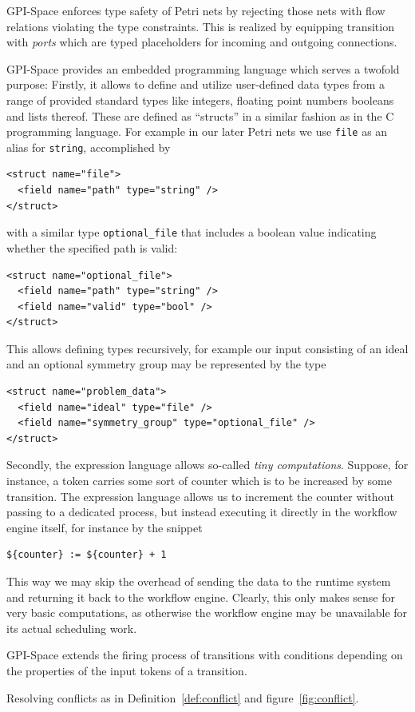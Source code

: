 \documentclass[
  paper=a4,
  titlepage,
  bibliography=totoc,
  listof=totoc,
  pagesize=pdftex
]{scrartcl}
\numberwithin{figure}{section}
\numberwithin{equation}{section}
\numberwithin{table}{section}
\theoremstyle{definition}
\numberwithin{definition}{section}
\begin{document}
\begin{description}[leftmargin=\parindent]
    GPI-Space enforces type safety of Petri nets by rejecting those nets with flow
    relations violating the type constraints. This is realized by equipping transition with
    \emph{ports} which are typed placeholders for incoming and outgoing connections.
  \item[Expression Language:] GPI-Space provides an embedded programming language which
    serves a twofold purpose: Firstly, it allows to define and utilize user-defined data
    types from a range of provided standard types like integers, floating point numbers
    booleans and lists thereof. These are defined as \enquote{structs} in a similar
    fashion as in the C programming language. For example in our later Petri nets we use
    \texttt{file} as an alias for \texttt{string}, accomplished by
    \begin{verbatim}
<struct name="file">
  <field name="path" type="string" />
</struct>\end{verbatim}%
    with a similar type \texttt{optional\_file} that includes a boolean value indicating
    whether the specified path is valid:
    \begin{verbatim}
<struct name="optional_file">
  <field name="path" type="string" />
  <field name="valid" type="bool" />
</struct>\end{verbatim}%
    This allows defining types recursively, for example our input consisting of an ideal
    and an optional symmetry group may be represented by the type
    \begin{verbatim}
<struct name="problem_data">
  <field name="ideal" type="file" />
  <field name="symmetry_group" type="optional_file" />
</struct>\end{verbatim}%

    Secondly, the expression language allows so-called \emph{tiny computations}. Suppose,
    for instance, a token carries some sort of counter which is to be increased by some
    transition. The expression language allows us to increment the counter without passing
    to a dedicated process, but instead executing it directly in the workflow engine
    itself, for instance by the snippet
    \begin{verbatim}${counter} := ${counter} + 1\end{verbatim}
    This way we may skip the overhead of sending the data to the runtime system and
    returning it back to the workflow engine. Clearly, this only makes sense for very
    basic computations, as otherwise the workflow engine may be unavailable for its actual
    scheduling work.
  \item[Conditions:] GPI-Space extends the firing process of transitions with conditions
    depending on the properties of the input tokens of a transition.

    Resolving conflicts as in Definition~\ref{def:conflict} and figure~\ref{fig:conflict}.
\end{description}
\end{document}
